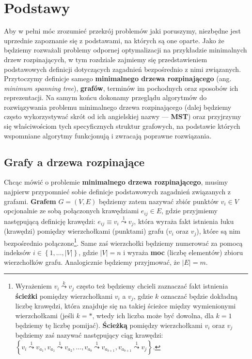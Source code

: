 \chapter{Podstawy}\label{ch:mst}
\thispagestyle{chapterBeginStyle}

Aby w pełni móc zrozumieć przekrój problemów jaki poruszymy, niezbędne jest uprzednie zapoznanie się z podstawami, na których są one oparte. Jako że będziemy rozważali problemy odpornej optymalizacji na przykładzie minimalnych drzew rozpinających, w tym rozdziale zajmiemy się przedstawieniem podstawowych definicji dotyczących zagadnień bezpośrednio z nimi związanych. Przytoczymy definicje samego \textbf{minimalnego drzewa rozpinającego} (ang. \textit{minimum spanning tree}), \textbf{grafów}, terminów im pochodnych oraz sposobów ich reprezentacji. Na samym końcu dokonamy przeglądu algorytmów do rozwiązywania problemu minimalnego drzewa rozpinającego (dalej będziemy często wykorzystywać skrót od ich angielskiej nazwy --- \textbf{MST}) oraz przyjrzymy się właściwościom tych specyficznych struktur grafowych, na podstawie których wspomniane algorytmy funkcjonują i zwracają poprawne rozwiązania.

\section{Grafy a drzewa rozpinające}

Chcąc mówić o problemie \textbf{minimalnego drzewa rozpinającego}, musimy najpierw przypomnieć sobie definicje podstawowych zagadnień związanych z grafami. \textbf{Grafem} $G = \left( V, E \right)$ będziemy zatem nazywać zbiór punktów $v_{i} \in V$ opcjonalnie ze sobą połączonych krawędziami $e_{ij} \in E$, gdzie przyjmiemy następującą definicję krawędzi: $e_{ij} \equiv v_{i} \overset{1}{\leadsto} v_{j}$, która wyraża fakt istnienia łuku (krawędzi) pomiędzy wierzchołkami (punktami) grafu ($v_{i}$ oraz $v_{j}$), które są nim bezpośrednio połączone\footnote{Wyrażeniem $v_{i} \overset{k}{\leadsto} v_{j}$ często też będziemy chcieli zaznaczać fakt istnienia \textbf{ścieżki} pomiędzy wierzchołkami $v_{i}$ a $v_{j}$, gdzie $k$ oznaczać będzie dokładną liczbę krawędzi, która znajduje się na takiej ścieżce między wymienionymi wierzchołkami (jeśli $k = \ast$, wtedy ich liczba może być dowolna, dla $k = 1$ będziemy tę liczbę pomijać). \textbf{Ścieżką} pomiędzy wierzchołkami $v_{i}$ oraz $v_{j}$ będziemy zaś nazywać następujący ciąg krawędzi: $\left\{ v_{i} \overset{1}{\leadsto} v_{a_{1}}, v_{a_{1}} \overset{1}{\leadsto} v_{a_{2}}, \dots, v_{a_{b}} \overset{1}{\leadsto} v_{a_{b+1}}, v_{a_{b+1}} \overset{1}{\leadsto} v_{j}  \right\}$.}. Same zaś wierzchołki będziemy numerować za pomocą indeksów $i \in \left\{ 1, \dots, \left| V \right| \right\}$, gdzie $\left| V \right| = n$ i wyraża \textbf{moc} (liczbę elementów) zbioru wierzchołków grafu. Analogicznie będziemy przyjmować, że $\left| E \right| = m$. 

